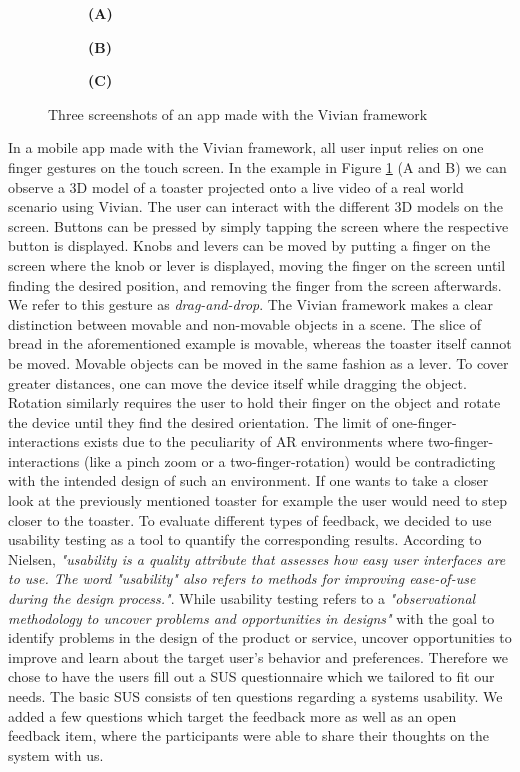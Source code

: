 \documentclass[11pt, a4paper]{article}
\begin{document}
\begin{figure}[H]
			\begin{subfigure}[t]{.32\textwidth}\centering
				\textbf{(A)}
			\end{subfigure}
			\begin{subfigure}[t]{.32\textwidth}\centering
				\textbf{(B)}
			\end{subfigure}
			\begin{subfigure}[t]{.32\textwidth}\centering
				\textbf{(C)}
			\end{subfigure}
			\caption{Three screenshots of an app made with the Vivian framework}
			\label{fig:feedbackonphone}
		\end{figure}
		In a mobile app made with the Vivian framework, all user input relies on one finger gestures on the touch screen. In the example in Figure \ref{fig:feedbackonphone} (A and B) we can observe a 3D model of a toaster projected onto a live video of a real world scenario using Vivian. The user can interact with the different 3D models on the screen. Buttons can be pressed by simply tapping the screen where the respective button is displayed. Knobs and levers can be moved by putting a finger on the screen where the knob or lever is displayed, moving the finger on the screen until finding the desired position, and removing the finger from the screen afterwards. We refer to this gesture as \emph{drag-and-drop}. The Vivian framework makes a clear distinction between movable and non-movable objects in a scene. The slice of bread in the aforementioned example is movable, whereas the toaster itself cannot be moved. Movable objects can be moved in the same fashion as a lever. To cover greater distances, one can move the device itself while dragging the object. Rotation similarly requires the user to hold their finger on the object and rotate the device until they find the desired orientation.
		The limit of one-finger-interactions exists due to the peculiarity of \ac{AR} environments where two-finger-interactions (like a pinch zoom or a two-finger-rotation) would be contradicting with the intended design of such an environment. If one wants to take a closer look at the previously mentioned toaster for example the user would need to step closer to the toaster.
		To evaluate different types of feedback, we decided to use usability testing as a tool to quantify the corresponding results. According to Nielsen, \textit{"usability is a quality attribute that assesses how easy user interfaces are to use. The word "usability" also refers to methods for improving ease-of-use during the design process."}\cite{Nielsen2012}. While usability testing refers to a \textit{"observational methodology to uncover problems and opportunities in designs"} with the goal to identify problems in the design of the product or service, uncover opportunities to improve and learn about the target user's behavior and preferences\cite{Moran2019}. Therefore we chose to have the users fill out a \ac{SUS} questionnaire which we tailored to fit our needs. The basic \ac{SUS} consists of ten questions regarding a systems usability. We added a few questions which target the feedback more as well as an open feedback item, where the participants were able to share their thoughts on the system with us. 
\end{document}
